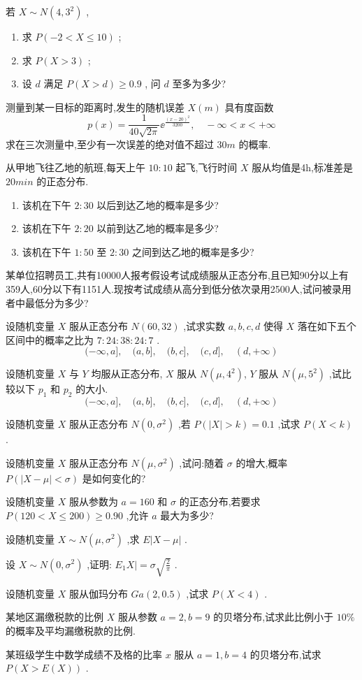 \begin{xiti}
\begin{enumerate}
\end{enumerate}
\item 若 $ X \sim N\left(4,3^{2}\right) $ ,
\begin{enumerate}
	\item 求 $ P(-2<X \leqslant 10) $ ;
	\item 求 $ P(X>3) $ ;
	\item 设 $ d $ 满足 $ P(X>d)  \geqslant 0.9 $ , 问 $ d $ 至多为多少?
\end{enumerate}
\item 测量到某一目标的距离时,发生的随机误差 $ X(m) $ 具有度函数
\[
p(x)=\frac{1}{40 \sqrt{2 \pi}} \ee ^{\frac{(x-20)^{2}}{3200}}, \quad-\infty<x<+\infty
\]
求在三次测量中,至少有一次误差的绝对值不超过 $ 30m $ 的概率.
\item 从甲地飞往乙地的航班,每天上午 $ 10:10 $ 起飞,飞行时间 $ X $ 服从均值是4h,标准差是 $ 20min $ 的正态分布.
\begin{enumerate}
	\item 该机在下午 $ 2:30 $ 以后到达乙地的概率是多少?
	\item 该机在下午 $ 2:20 $ 以前到达乙地的概率是多少?
	\item 该机在下午 $ 1:50 $ 至 $ 2:30 $ 之间到达乙地的概率是多少?
\end{enumerate}
\item 某单位招聘员工,共有10000人报考假设考试成绩服从正态分布,且已知90分以上有359人,60分以下有1151人.现按考试成绩从高分到低分依次录用2500人,试问被录用者中最低分为多少?
\item 设随机变量 $ X $ 服从正态分布 $ N(60,32) $ ,试求实数 $ a,b,c,d $ 使得 $ X $ 落在如下五个区间中的概率之比为 $ 7:24:38:24:7 $ .
\[
(-\infty, a], \quad(a, b], \quad(b, c], \quad(c, d], \quad(d,+\infty)
\]
\item 设随机变量 $ X $ 与 $ Y $ 均服从正态分布, $ X $ 服从 $ N\left(\mu, 4^{2}\right) $, $ Y $ 服从 $ N\left(\mu, 5^{2}\right) $ ,试比较以下 $ p_{1} $ 和 $ p_{2} $ 的大小.
\[
(-\infty, a], \quad(a, b], \quad(b, c], \quad(c, d], \quad(d,+\infty)
\]
\item 设随机变量 $ X $ 服从正态分布 $ N\left(0, \sigma^{2}\right) $ ,若 $ P(|X|>k)=0.1 $ ,试求 $ P(X<k) $ .
\item 设随机变量 $ X $ 服从正态分布 $ N\left(\mu, \sigma^{2}\right) $ ,试问:随着 $ \sigma $ 的增大,概率 $ P(|X-\mu|<\sigma) $ 是如何变化的?
\item 设随机变量 $ X $ 服从参数为 $ a=160 $ 和 $ \sigma $ 的正态分布,若要求 $ P(120<X \leqslant 200) \geqslant 0.90 $ ,允许 $ a $ 最大为多少?
\item 设随机变量 $ X \sim N\left(\mu, \sigma^{2}\right) $ ,求 $ E | X-\mu | $ .
\item 设 $ X \sim N\left(0, \sigma^{2}\right) $ ,证明: $ E_{1} X |=\sigma \sqrt{\frac{2}{\pi}} $ .
\item 设随机变量 $ X $ 服从伽玛分布 $ G a(2,0.5) $ ,试求 $ P(X<4) $ .
\item 某地区漏缴税款的比例 $ X $ 服从参数 $ a=2,b=9 $ 的贝塔分布,试求此比例小于 $ 10\% $ 的概率及平均漏缴税款的比例.
\item 某班级学生中数学成绩不及格的比率 $ x $ 服从 $ a=1,b=4 $ 的贝塔分布,试求 $ P(X>E(X)) $ .
\end{xiti}

